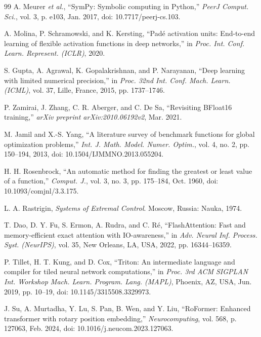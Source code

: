 \documentclass[11pt,a4paper]{article}
\renewcommand{\_}{\origunderscore\allowbreak}
\begin{document}
\begin{thebibliography}{99}
A. Meurer \textit{et al.}, ``SymPy: Symbolic computing in Python,'' \textit{PeerJ Comput. Sci.}, vol. 3, p. e103, Jan. 2017, doi: 10.7717/peerj-cs.103.

A. Molina, P. Schramowski, and K. Kersting, ``Pad\'e activation units: End-to-end learning of flexible activation functions in deep networks,'' in \textit{Proc. Int. Conf. Learn. Represent. (ICLR)}, 2020.

S. Gupta, A. Agrawal, K. Gopalakrishnan, and P. Narayanan, ``Deep learning with limited numerical precision,'' in \textit{Proc. 32nd Int. Conf. Mach. Learn. (ICML)}, vol. 37, Lille, France, 2015, pp. 1737--1746.

P. Zamirai, J. Zhang, C. R. Aberger, and C. De Sa, ``Revisiting BFloat16 training,'' \textit{arXiv preprint arXiv:2010.06192v2}, Mar. 2021.

M. Jamil and X.-S. Yang, ``A literature survey of benchmark functions for global optimization problems,'' \textit{Int. J. Math. Model. Numer. Optim.}, vol. 4, no. 2, pp. 150--194, 2013, doi: 10.1504/IJMMNO.2013.055204.

H. H. Rosenbrock, ``An automatic method for finding the greatest or least value of a function,'' \textit{Comput. J.}, vol. 3, no. 3, pp. 175--184, Oct. 1960, doi: 10.1093/comjnl/3.3.175.

L. A. Rastrigin, \textit{Systems of Extremal Control}. Moscow, Russia: Nauka, 1974.

T. Dao, D. Y. Fu, S. Ermon, A. Rudra, and C. R\'e, ``FlashAttention: Fast and memory-efficient exact attention with IO-awareness,'' in \textit{Adv. Neural Inf. Process. Syst. (NeurIPS)}, vol. 35, New Orleans, LA, USA, 2022, pp. 16344--16359.

P. Tillet, H. T. Kung, and D. Cox, ``Triton: An intermediate language and compiler for tiled neural network computations,'' in \textit{Proc. 3rd ACM SIGPLAN Int. Workshop Mach. Learn. Program. Lang. (MAPL)}, Phoenix, AZ, USA, Jun. 2019, pp. 10--19, doi: 10.1145/3315508.3329973.

J. Su, A. Murtadha, Y. Lu, S. Pan, B. Wen, and Y. Liu, ``RoFormer: Enhanced transformer with rotary position embedding,'' \textit{Neurocomputing}, vol. 568, p. 127063, Feb. 2024, doi: 10.1016/j.neucom.2023.127063.


\end{thebibliography}
\end{document}
